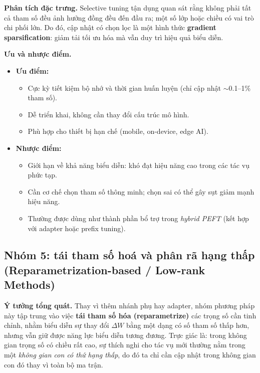 \textbf{Phân tích đặc trưng.}  
Selective tuning tận dụng quan sát rằng không phải tất cả tham số đều ảnh hưởng đồng đều đến đầu ra; một số lớp hoặc chiều có vai trò chi phối lớn.  
Do đó, cập nhật có chọn lọc là một hình thức \textbf{gradient sparsification}: giảm tải tối ưu hóa mà vẫn duy trì hiệu quả biểu diễn.

\textbf{Ưu và nhược điểm.}
\begin{itemize}
	\item \textbf{Ưu điểm:}
	\begin{itemize}
		\item Cực kỳ tiết kiệm bộ nhớ và thời gian huấn luyện (chỉ cập nhật $\sim$0.1–1\% tham số).  
		\item Dễ triển khai, không cần thay đổi cấu trúc mô hình.  
		\item Phù hợp cho thiết bị hạn chế (mobile, on-device, edge AI).  
	\end{itemize}
	\item \textbf{Nhược điểm:}
	\begin{itemize}
		\item Giới hạn về khả năng biểu diễn: khó đạt hiệu năng cao trong các tác vụ phức tạp.  
		\item Cần cơ chế chọn tham số thông minh; chọn sai có thể gây sụt giảm mạnh hiệu năng.  
		\item Thường được dùng như thành phần bổ trợ trong \textit{hybrid PEFT} (kết hợp với adapter hoặc prefix tuning).  
	\end{itemize}
\end{itemize}

\subsection{Nhóm 5: tái tham số hoá và phân rã hạng thấp (Reparametrization-based / Low-rank Methods)}
\label{ssec:reparam}

\textbf{Ý tưởng tổng quát.}  
Thay vì thêm nhánh phụ hay adapter, nhóm phương pháp này tập trung vào việc \textbf{tái tham số hóa (reparametrize)} các trọng số cần tinh chỉnh, nhằm biểu diễn sự thay đổi $\Delta W$ bằng một dạng có số tham số thấp hơn, nhưng vẫn giữ được năng lực biểu diễn tương đương.  
Trực giác là: trong không gian trọng số có chiều rất cao, sự thích nghi cho tác vụ mới thường nằm trong một \textit{không gian con có thứ hạng thấp}, do đó ta chỉ cần cập nhật trong không gian con đó thay vì toàn bộ ma trận.

